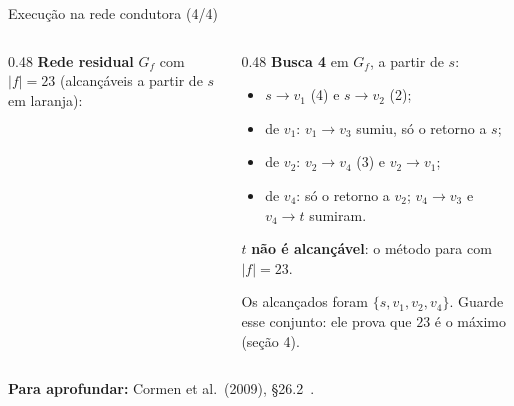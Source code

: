 \documentclass[aspectratio=169,xcolor=table]{beamer}
\newcommand{\nosrede}[1]{%
  \node[vert] (s)  at (0,0)     {$s$};
  \node[vert] (v1) at (1.7,1)   {$v_1$};
  \node[vert] (v2) at (1.7,-1)  {$v_2$};
  \node[vert] (v3) at (3.6,1)   {$v_3$};
  \node[vert] (v4) at (3.6,-1)  {$v_4$};
  \node[vert] (t)  at (5.3,0)   {$t$};
  \def\lista{#1}\ifx\lista\empty\else
    \foreach \v/\n in {#1} \node[vS] at (\v) {$\n$};\fi
}
\newcommand{\redeR}[2]{%
  \nosrede{#2}
  \edef\arcosR{#1}
  \foreach \u/\v/\l/\e in \arcosR \draw[\e] (\u) to (\v);
  \foreach \u/\v/\l/\e in \arcosR \path[\e, draw=none] (\u) to node[peso] {\l} (\v);
}
\newcommand{\fonte}[1]{%
  \vfill
  {\tiny\color{gray!55!black}\textbf{Para aprofundar:} #1\par}%
}
\begin{document}
\begin{frame}{Execução na rede condutora (4/4)}
  \begin{columns}[T]
    \begin{column}{0.48\textwidth}
      \scriptsize
      \textbf{Rede residual} $G_f$ com $|f| = 23$ (alcançáveis a partir de $s$ em laranja):
      \begin{center}
      \end{center}
    \end{column}
    \begin{column}{0.48\textwidth}
      \scriptsize
      \textbf{Busca 4} em $G_f$, a partir de $s$:
      \begin{itemize}
        \item $s \to v_1$ (4) e $s \to v_2$ (2);
        \item de $v_1$: $v_1 \to v_3$ sumiu, só o retorno a $s$;
        \item de $v_2$: $v_2 \to v_4$ (3) e $v_2 \to v_1$;
        \item de $v_4$: só o retorno a $v_2$; $v_4 \to v_3$ e $v_4 \to t$ sumiram.
      \end{itemize}
      $t$ \textbf{não é alcançável}: o método para com $|f| = 23$.
      \medskip

      Os alcançados foram $\{s, v_1, v_2, v_4\}$. Guarde esse conjunto: ele prova que $23$
      é o máximo (seção 4).
    \end{column}
  \end{columns}
  \fonte{Cormen et al.\ (2009), \S 26.2~\cite{cormen2009introduction}.}
\end{frame}
\end{document}
